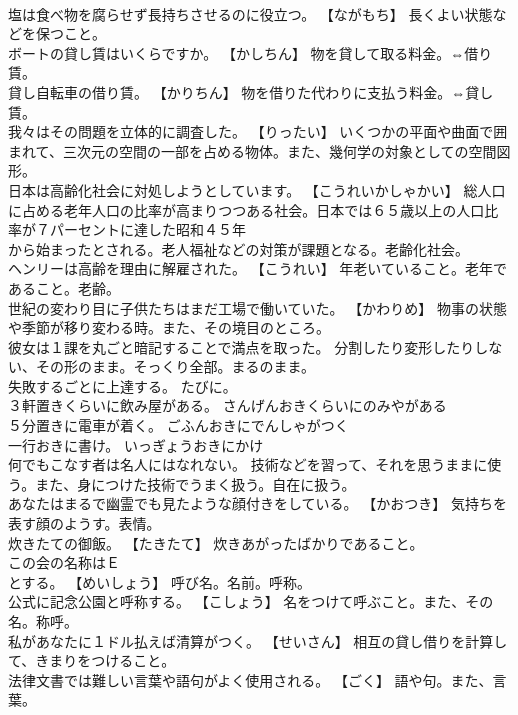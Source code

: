 \documentclass[8pt]{extreport}
\begin{document}
\begin{CJK}{UTF8}{min}
\\	塩は食べ物を腐らせず長持ちさせるのに役立つ。	【ながもち】 長くよい状態などを保つこと。
\\	ボートの貸し賃はいくらですか。	【かしちん】 物を貸して取る料金。⇔借り賃。
\\	貸し自転車の借り賃。	【かりちん】 物を借りた代わりに支払う料金。⇔貸し賃。
\\	我々はその問題を立体的に調査した。	【りったい】 いくつかの平面や曲面で囲まれて、三次元の空間の一部を占める物体。また、幾何学の対象としての空間図形。
\\	日本は高齢化社会に対処しようとしています。	【こうれいかしゃかい】 総人口に占める老年人口の比率が高まりつつある社会。日本では６５歳以上の人口比率が７パーセントに達した昭和４５年
\\	から始まったとされる。老人福祉などの対策が課題となる。老齢化社会。
\\	ヘンリーは高齢を理由に解雇された。	【こうれい】 年老いていること。老年であること。老齢。
\\	世紀の変わり目に子供たちはまだ工場で働いていた。	【かわりめ】 物事の状態や季節が移り変わる時。また、その境目のところ。
\\	彼女は１課を丸ごと暗記することで満点を取った。	分割したり変形したりしない、その形のまま。そっくり全部。まるのまま。
\\	失敗するごとに上達する。	たびに。
\\	３軒置きくらいに飲み屋がある。	さんげんおきくらいにのみやがある 
\\	５分置きに電車が着く。	ごふんおきにでんしゃがつく 
\\	一行おきに書け。	いっぎょうおきにかけ 
\\	何でもこなす者は名人にはなれない。	技術などを習って、それを思うままに使う。また、身につけた技術でうまく扱う。自在に扱う。
\\	あなたはまるで幽霊でも見たような顔付きをしている。	【かおつき】 気持ちを表す顔のようす。表情。
\\	炊きたての御飯。	【たきたて】 炊きあがったばかりであること。
\\	この会の名称はＥ
\\	とする。	【めいしょう】 呼び名。名前。呼称。
\\	公式に記念公園と呼称する。	【こしょう】 名をつけて呼ぶこと。また、その名。称呼。
\\	私があなたに１ドル払えば清算がつく。	【せいさん】 相互の貸し借りを計算して、きまりをつけること。
\\	法律文書では難しい言葉や語句がよく使用される。	【ごく】 語や句。また、言葉。

\end{CJK}
\end{document}
